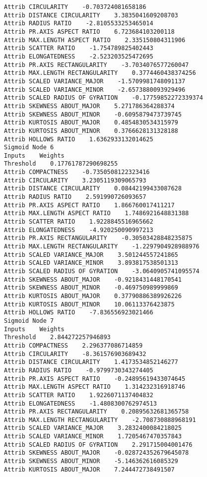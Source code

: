 \documentclass[
	article,			%
	11pt,				%
	oneside,			%
	a4paper,			%
	english,			%
	brazil,				%
	sumario=tradicional
	]{abntex2}
\begin{document}
\begin{lstlisting}
Attrib CIRCULARITY    -0.703724081658186
Attrib DISTANCE CIRCULARITY    3.3835041609208703
Attrib RADIUS RATIO    -2.8105533253465014
Attrib PR.AXIS ASPECT RATIO    6.723684103200118
Attrib MAX.LENGTH ASPECT RATIO    2.335150804311906
Attrib SCATTER RATIO    -1.754789825402443
Attrib ELONGATEDNESS    -2.523203525472695
Attrib PR.AXIS RECTANGULARITY    -3.7034076577260047
Attrib MAX.LENGTH RECTANGULARITY    0.3774460438374256
Attrib SCALED VARIANCE_MAJOR    -1.5709981748091137
Attrib SCALED VARIANCE_MINOR    -2.6573880093929496
Attrib SCALED RADIUS OF GYRATION    -0.17759852272339374
Attrib SKEWNESS ABOUT_MAJOR    5.271786364288374
Attrib SKEWNESS ABOUT_MINOR    -0.6095879473739745
Attrib KURTOSIS ABOUT_MAJOR    0.4854830534315979
Attrib KURTOSIS ABOUT_MINOR    0.3766628131328188
Attrib HOLLOWS RATIO    1.6362933132014625
Sigmoid Node 6
Inputs    Weights
Threshold    0.17761787290698255
Attrib COMPACTNESS    -0.7350508122323416
Attrib CIRCULARITY    3.2305119309065793
Attrib DISTANCE CIRCULARITY    0.08442199433087628
Attrib RADIUS RATIO    2.591990726093657
Attrib PR.AXIS ASPECT RATIO    1.866760017411217
Attrib MAX.LENGTH ASPECT RATIO    1.7486921648831388
Attrib SCATTER RATIO    1.9228845516965662
Attrib ELONGATEDNESS    -4.920250090997213
Attrib PR.AXIS RECTANGULARITY    -0.30503428848235875
Attrib MAX.LENGTH RECTANGULARITY    -1.2297904928988976
Attrib SCALED VARIANCE_MAJOR    3.501244557241865
Attrib SCALED VARIANCE_MINOR    3.893817538501313
Attrib SCALED RADIUS OF GYRATION    -3.0640905741095574
Attrib SKEWNESS ABOUT_MAJOR    -0.9218431448170541
Attrib SKEWNESS ABOUT_MINOR    -0.469750989999869
Attrib KURTOSIS ABOUT_MAJOR    0.37790886389926226
Attrib KURTOSIS ABOUT_MINOR    10.06113376423875
Attrib HOLLOWS RATIO    -7.836556923021466
Sigmoid Node 7
Inputs    Weights
Threshold    2.844272257946893
Attrib COMPACTNESS    2.296377086714859
Attrib CIRCULARITY    -8.361576903689432
Attrib DISTANCE CIRCULARITY    1.4173534852146277
Attrib RADIUS RATIO    -0.9799730343274405
Attrib PR.AXIS ASPECT RATIO    -0.24895619433074645
Attrib MAX.LENGTH ASPECT RATIO    1.314232316918746
Attrib SCATTER RATIO    1.9226071137404832
Attrib ELONGATEDNESS    -1.4808300762974513
Attrib PR.AXIS RECTANGULARITY    0.20895632681365758
Attrib MAX.LENGTH RECTANGULARITY    -2.708730888968191
Attrib SCALED VARIANCE_MAJOR    3.2832400084218025
Attrib SCALED VARIANCE_MINOR    1.7205467470357843
Attrib SCALED RADIUS OF GYRATION    2.291715004001476
Attrib SKEWNESS ABOUT_MAJOR    -0.028724352679645078
Attrib SKEWNESS ABOUT_MINOR    -5.146362616085329
Attrib KURTOSIS ABOUT_MAJOR    7.244472738491507

\end{lstlisting}
\end{document}

